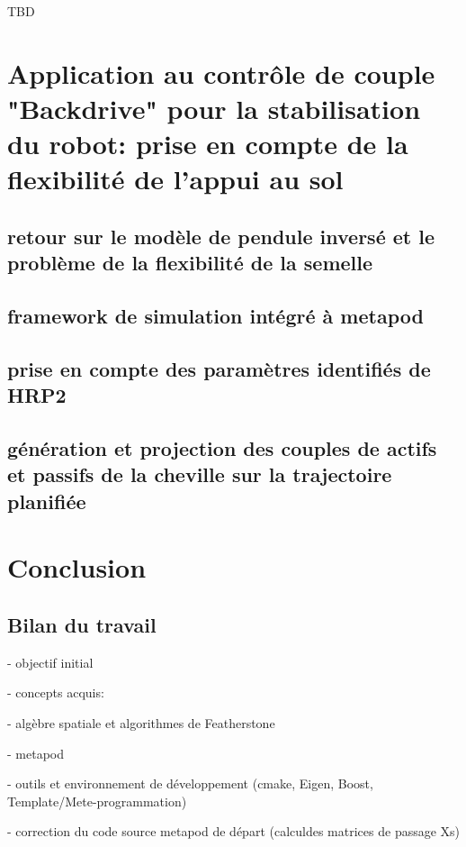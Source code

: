 \documentclass{report}
\begin{document}
TBD

\chapter{Application au contrôle de couple "Backdrive" pour la stabilisation du robot: prise en compte de la flexibilité de l'appui au sol}

\section{retour sur le modèle de pendule inversé et le problème de la flexibilité de la semelle}

\section{framework de simulation intégré à metapod}

\section{prise en compte des paramètres identifiés de HRP2}

\section{génération et projection des couples de actifs et passifs de la cheville sur la trajectoire planifiée}


\chapter*{Conclusion}
%

\section*{Bilan du travail}

- objectif initial

- concepts acquis:

	- algèbre spatiale et algorithmes de Featherstone
	
	- metapod
	
	- outils et environnement de développement (cmake, Eigen, Boost, Template/Mete-programmation)

- correction du code source metapod de départ (calculdes matrices de passage Xs)
\end{document}
